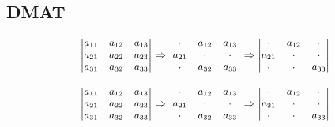 \documentclass[../main]{subfiles}
\begin{document}
\leaderfill
\subsection{DMAT}

\[
    {\small\left|\begin{matrix}{}a_{11}&a_{12}&a_{13}\\a_{21}&a_{22}&a_{23}\\a_{31}&a_{32}&a_{33}\end{matrix}\right|} \Rightarrow
    {\small\left|\begin{matrix}{}\cdot&a_{12}&a_{13}\\a_{21}&\cdot&\cdot\\\cdot&a_{32}&a_{33}\end{matrix}\right|} \Rightarrow
    {\small\left|\begin{matrix}{}\cdot&a_{12}&\cdot\\a_{21}&\cdot&\cdot\\\cdot&\cdot&a_{33}\end{matrix}\right|}
\]
\begin{code}[language=tex]
\[
    {\small\left|\begin{matrix}{}a_{11}&a_{12}&a_{13}\\a_{21}&a_{22}&a_{23}\\a_{31}&a_{32}&a_{33}\end{matrix}\right|} \Rightarrow
    {\small\left|\begin{matrix}{}\cdot&a_{12}&a_{13}\\a_{21}&\cdot&\cdot\\\cdot&a_{32}&a_{33}\end{matrix}\right|} \Rightarrow
    {\small\left|\begin{matrix}{}\cdot&a_{12}&\cdot\\a_{21}&\cdot&\cdot\\\cdot&\cdot&a_{33}\end{matrix}\right|}
\]
\end{code}

\end{document}
